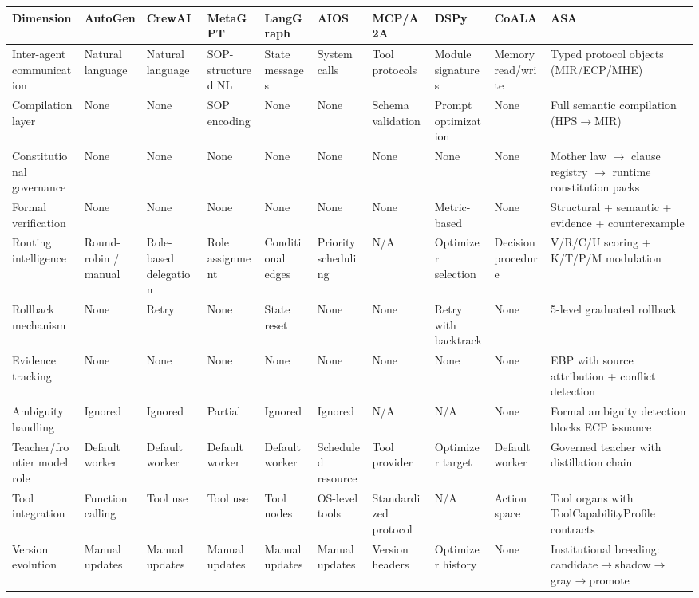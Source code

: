 \documentclass[12pt,a4paper]{article}
\begin{document}
\begin{table}[htbp]
\centering
\small
\begin{tabular}{llllllllll}
\toprule
Dimension & AutoGen & CrewAI & MetaGPT & LangGraph & AIOS & MCP/A2A & DSPy & CoALA & ASA \\
\midrule
Inter-agent communication & Natural language & Natural language & SOP-structured NL & State messages & System calls & Tool protocols & Module signatures & Memory read/write & Typed protocol objects (MIR/ECP/MHE) \\
Compilation layer & None & None & SOP encoding & None & None & Schema validation & Prompt optimization & None & Full semantic compilation (HPS$\rightarrow$MIR) \\
Constitutional governance & None & None & None & None & None & None & None & None & Mother law $\rightarrow$ clause registry $\rightarrow$ runtime constitution packs \\
Formal verification & None & None & None & None & None & None & Metric-based & None & Structural + semantic + evidence + counterexample \\
Routing intelligence & Round-robin / manual & Role-based delegation & Role assignment & Conditional edges & Priority scheduling & N/A & Optimizer selection & Decision procedure & V/R/C/U scoring + K/T/P/M modulation \\
Rollback mechanism & None & Retry & None & State reset & None & None & Retry with backtrack & None & 5-level graduated rollback \\
Evidence tracking & None & None & None & None & None & None & None & None & EBP with source attribution + conflict detection \\
Ambiguity handling & Ignored & Ignored & Partial & Ignored & Ignored & N/A & N/A & None & Formal ambiguity detection blocks ECP issuance \\
Teacher/frontier model role & Default worker & Default worker & Default worker & Default worker & Scheduled resource & Tool provider & Optimizer target & Default worker & Governed teacher with distillation chain \\
Tool integration & Function calling & Tool use & Tool use & Tool nodes & OS-level tools & Standardized protocol & N/A & Action space & Tool organs with ToolCapabilityProfile contracts \\
Version evolution & Manual updates & Manual updates & Manual updates & Manual updates & Manual updates & Version headers & Optimizer history & None & Institutional breeding: candidate$\rightarrow$shadow$\rightarrow$gray$\rightarrow$promote \\

\end{tabular}
\end{table}
\end{document}
